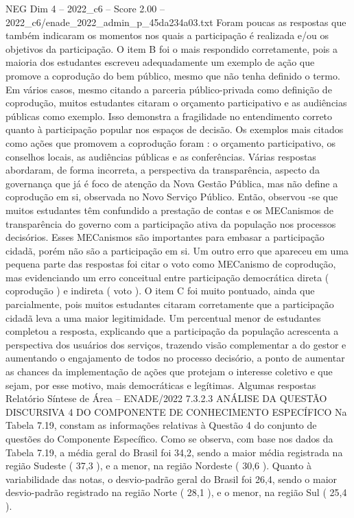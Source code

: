 \begin{textsample}{NEG Dim 4 – 2022\_c6 – Score 2.00 – 2022\_c6/enade\_2022\_admin\_p\_45da234a03.txt}
Foram poucas as respostas que também indicaram os momentos nos quais a participação é realizada e/ou os objetivos da participação.
O item B foi o mais respondido corretamente, pois a maioria dos estudantes escreveu adequadamente um exemplo de ação que promove a coprodução do bem público, mesmo que não tenha definido o termo.
Em vários casos, mesmo citando a parceria público-privada como definição de coprodução, muitos estudantes citaram o orçamento participativo e as audiências públicas como exemplo.
Isso demonstra a fragilidade no entendimento correto quanto à participação popular nos espaços de decisão.
Os exemplos mais citados como ações que promovem a coprodução foram : o orçamento participativo, os conselhos locais, as audiências públicas e as conferências.
Várias respostas abordaram, de forma incorreta, a perspectiva da transparência, aspecto da governança que já é foco de atenção da Nova Gestão Pública, mas não define a coprodução em si, observada no Novo Serviço Público.
Então, observou -se que muitos estudantes têm confundido a prestação de contas e os MECanismos de transparência do governo com a participação ativa da população nos processos decisórios.
Esses MECanismos são importantes para embasar a participação cidadã, porém não são a participação em si.
Um outro erro que apareceu em uma pequena parte das respostas foi citar o voto como MECanismo de coprodução, mas evidenciando um erro conceitual entre participação democrática direta ( coprodução ) e indireta ( voto ).
O item C foi muito pontuado, ainda que parcialmente, pois muitos estudantes citaram corretamente que a participação cidadã leva a uma maior legitimidade.
Um percentual menor de estudantes completou a resposta, explicando que a participação da população acrescenta a perspectiva dos usuários dos serviços, trazendo visão complementar a do gestor e aumentando o engajamento de todos no processo decisório, a ponto de aumentar as chances da implementação de ações que protejam o interesse coletivo e que sejam, por esse motivo, mais democráticas e legítimas.
Algumas respostas Relatório Síntese de Área – ENADE/2022 7.3.2.3 ANÁLISE DA QUESTÃO DISCURSIVA 4 DO COMPONENTE DE CONHECIMENTO ESPECÍFICO Na Tabela 7.19, constam as informações relativas à Questão 4 do conjunto de questões do Componente Específico.
Como se observa, com base nos dados da Tabela 7.19, a média geral do Brasil foi 34,2, sendo a maior média registrada na região Sudeste ( 37,3 ), e a menor, na região Nordeste ( 30,6 ).
Quanto à variabilidade das notas, o desvio-padrão geral do Brasil foi 26,4, sendo o maior desvio-padrão registrado na região Norte ( 28,1 ), e o menor, na região Sul ( 25,4 ).

\end{textsample}
